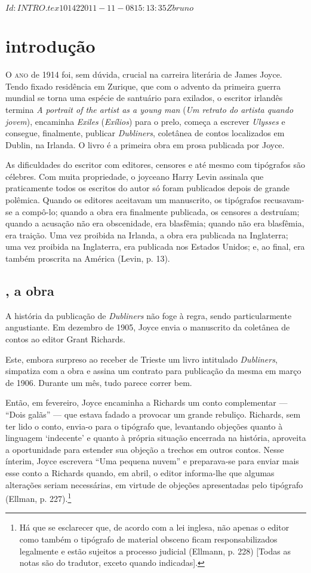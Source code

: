 \SVN $Id: INTRO.tex 10142 2011-11-08 15:13:35Z bruno $
\chapter[Introdução, por José Roberto O'Shea]{introdução}

\textsc{O ano} de 1914 foi, sem dúvida, crucial na carreira literária de James
Joyce. Tendo fixado residência em Zurique, que com o advento da
primeira guerra mundial se torna uma espécie de santuário para
exilados, o escritor irlandês termina \textit{A portrait of the artist as a
young man} (\textit{Um retrato do artista quando jovem}), encaminha
\textit{Exiles} (\textit{Exílios}) para o prelo, começa a escrever
\textit{Ulysses} e consegue, finalmente, publicar \textit{Dubliners},
coletânea de contos localizados em
Dublin, na Irlanda. O livro é a primeira obra em prosa publicada por
Joyce.

As dificuldades do escritor com editores, censores e até mesmo com
tipógrafos são célebres. Com muita propriedade, o joyceano Harry Levin
assinala que praticamente todos os escritos do autor só foram
publicados depois de grande polêmica. Quando os editores aceitavam um
manuscrito, os tipógrafos recusavam-se a compô-lo; quando a obra era
finalmente publicada, os censores a destruíam; quando a acusação não
era obscenidade, era blasfêmia; quando não era blasfêmia, era traição.
Uma vez proibida na Irlanda, a obra era publicada na Inglaterra; uma
vez proibida na Inglaterra, era publicada nos Estados Unidos; e, ao
final, era também proscrita na América (Levin, p. 13).

\section{, a obra}

A história da publicação de \textit{Dubliners} não foge à regra, sendo
particularmente angustiante. Em dezembro de 1905, Joyce envia o
manuscrito da coletânea de contos ao editor Grant Richards.

Este, embora surpreso ao receber de Trieste um livro intitulado
\textit{Dubliners}, simpatiza com a obra e assina um contrato para publicação
da mesma em março de 1906. Durante um mês, tudo parece correr bem.

Então, em fevereiro, Joyce encaminha a Richards um conto complementar
--- ``Dois galãs'' --- que estava fadado a provocar um grande
rebuliço. Richards, sem ter lido o conto, envia-o para o tipógrafo
que, levantando objeções quanto à linguagem `indecente' e quanto
à própria situação encerrada na história, aproveita a oportunidade
para estender sua objeção a trechos em outros contos. Nesse ínterim,
Joyce escrevera ``Uma pequena nuvem'' e preparava-se para enviar
mais esse conto a Richards quando, em abril, o editor informa-lhe que
algumas alterações seriam necessárias, em virtude de objeções
apresentadas pelo tipógrafo (Ellman, p. 227).\footnote{ Há que se
esclarecer que, de acordo com a lei inglesa, não apenas o editor como
também o tipógrafo de material obsceno ficam responsabilizados
legalmente e estão sujeitos a processo judicial (Ellmann, p. 228) [Todas as notas são do tradutor, exceto quando indicadas].}

